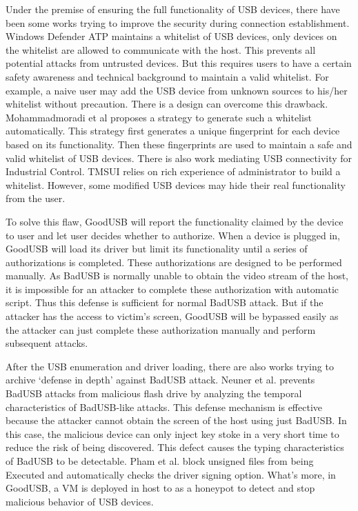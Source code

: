 Under the premise of ensuring the full functionality of USB devices, there have been some works trying to improve the security during connection establishment.
Windows Defender ATP\cite{windenfenderwhite} maintains a whitelist of USB devices, only devices on the whitelist are allowed to communicate with the host. This prevents all potential attacks from untrusted devices. But this requires users to have a certain safety awareness and technical background to maintain a valid whitelist. For example, a naive user may add the USB device from unknown sources to his/her whitelist without precaution. There is a design can overcome this drawback. Mohammadmoradi et al\cite{mohammadmoradi2018making} proposes a strategy to generate such a whitelist automatically. This strategy first generates a unique fingerprint for each device based on its functionality. Then these fingerprints are used to maintain a safe and valid whitelist of USB devices. There is also work mediating USB connectivity for Industrial Control. TMSUI\cite{yang2015tmsui} relies on rich experience of administrator to build a whitelist. However, some modified USB devices may hide their real functionality from the user.

To solve this flaw, GoodUSB\cite{tian2015defending} will report the functionality claimed by the device to user and let user decides whether to authorize. When a device is plugged in, GoodUSB will load its driver but limit its functionality until a series of authorizations is completed. These authorizations are designed to be performed manually. As BadUSB is normally unable to obtain the video stream of the host, it is impossible for an attacker to complete these authorization with automatic script. Thus this defense is sufficient for normal BadUSB attack. But if the attacker has the access to victim's screen, GoodUSB will be bypassed easily as the attacker can just complete these authorization manually and perform subsequent attacks.

After the USB enumeration and driver loading, there are also works trying to archive `defense in depth' against BadUSB attack.
Neuner et al.\cite{neuner2018usblock} prevents BadUSB attacks from malicious flash drive by analyzing the temporal characteristics of BadUSB-like attacks. This defense mechanism is effective because the attacker cannot obtain the screen of the host using just BadUSB. In this case, the malicious device can only inject key stoke in a very short time to reduce the risk of being discovered. This defect causes the typing characteristics of BadUSB to be detectable.  Pham et al. \cite{pham2010optimizing} block unsigned files from being Executed and automatically checks the driver signing option. What's more, in GoodUSB, a VM is deployed in host to as a honeypot to detect and stop malicious behavior of USB devices. 

